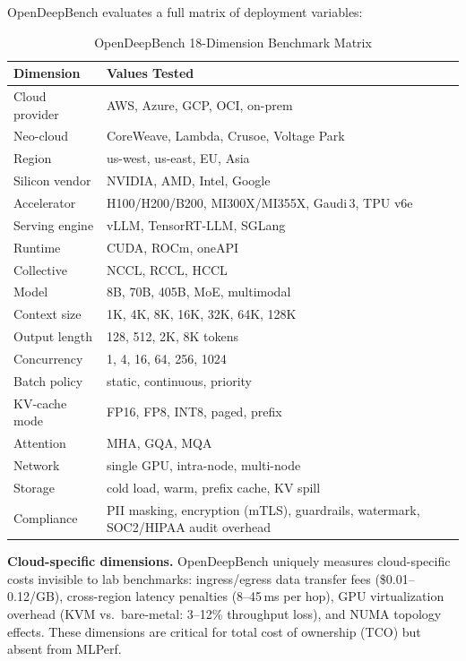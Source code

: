\documentclass[conference,10pt]{IEEEtran}
\begin{document}
OpenDeepBench evaluates a full matrix of deployment variables:

\begin{table}[!htbp]
\caption{OpenDeepBench 18-Dimension Benchmark Matrix}
\label{tab:benchmatrix}
\centering\footnotesize
\begin{tabular}{@{}lp{4.2cm}@{}}
\toprule
\textbf{Dimension} & \textbf{Values Tested} \\
\midrule
Cloud provider & AWS, Azure, GCP, OCI, on-prem \\
Neo-cloud & CoreWeave, Lambda, Crusoe, Voltage Park \\
Region & us-west, us-east, EU, Asia \\
Silicon vendor & NVIDIA, AMD, Intel, Google \\
Accelerator & H100/H200/B200, MI300X/MI355X, Gaudi\,3, TPU v6e \\
Serving engine & vLLM, TensorRT-LLM, SGLang \\
Runtime & CUDA, ROCm, oneAPI \\
Collective & NCCL, RCCL, HCCL \\
Model & 8B, 70B, 405B, MoE, multimodal \\
Context size & 1K, 4K, 8K, 16K, 32K, 64K, 128K \\
Output length & 128, 512, 2K, 8K tokens \\
Concurrency & 1, 4, 16, 64, 256, 1024 \\
Batch policy & static, continuous, priority \\
KV-cache mode & FP16, FP8, INT8, paged, prefix \\
Attention & MHA, GQA, MQA \\
Network & single GPU, intra-node, multi-node \\
Storage & cold load, warm, prefix cache, KV spill \\
Compliance & PII masking, encryption (mTLS), guardrails, watermark, SOC2/HIPAA audit overhead \\
\bottomrule
\end{tabular}
\end{table}

\textbf{Cloud-specific dimensions.} OpenDeepBench uniquely measures cloud-specific costs invisible to lab benchmarks: ingress/egress data transfer fees (\$0.01--0.12/GB), cross-region latency penalties (8--45\,ms per hop), GPU virtualization overhead (KVM vs.\ bare-metal: 3--12\% throughput loss), and NUMA topology effects. These dimensions are critical for total cost of ownership (TCO) but absent from MLPerf.
\end{document}
